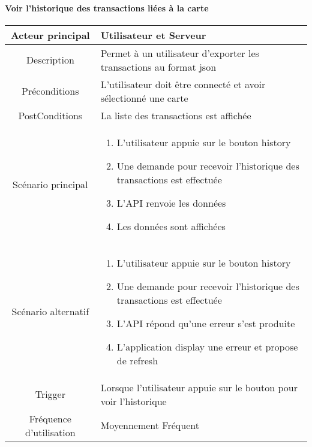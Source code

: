\documentclass{article}
\begin{document}
\paragraph{Voir l'historique des transactions liées à la carte}
    \begin{table}[h]
        \begin{tabular}{|c|p{10cm}|}
        \hline
        Acteur principal& Utilisateur et Serveur    \\
        \hline
        Description&  Permet à un utilisateur d'exporter les transactions au format json  \\
        \hline
        Préconditions& L'utilisateur doit être connecté et avoir sélectionné une carte \\
        \hline
        PostConditions&  La liste des transactions est affichée   \\
        \hline
        Scénario principal& 
                \begin{enumerate}
                    \item L'utilisateur appuie sur le bouton history
                    \item Une demande pour recevoir l'historique des transactions est effectuée
                    \item L'API renvoie les données
                    \item Les données sont affichées
                \end{enumerate}     \\
        \hline
        Scénario alternatif&  
            \begin{enumerate}
                \item L'utilisateur appuie sur le bouton history
                \item Une demande pour recevoir l'historique des transactions est effectuée
                \item L'API répond qu'une erreur s'est produite
                \item L'application display une erreur et propose de refresh
            \end{enumerate}     \\
        \hline
        Trigger&   Lorsque l'utilisateur appuie sur le bouton pour voir l'historique  \\
        \hline
        Fréquence d'utilisation&  Moyennement Fréquent  \\
        \hline
        \end{tabular}
    \end{table}
\end{document}
